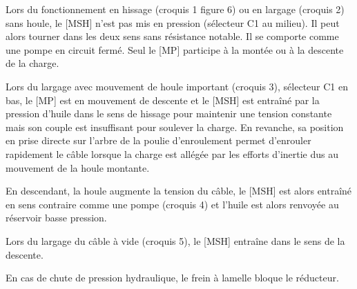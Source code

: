 \documentclass[10pt,fleqn]{article} %
\begin{document}
\vspace{.25cm}


\begin{minipage}[c]{.49\linewidth}
Lors du fonctionnement en hissage (croquis 1 figure 6) ou en largage (croquis 2) sans houle, le [MSH] n'est pas mis en pression (sélecteur C1 au milieu). Il peut alors tourner dans les deux sens sans résistance notable. Il se comporte comme une pompe en circuit fermé. Seul le [MP] participe à la montée ou à la descente de la charge. 

Lors du largage avec mouvement de houle important (croquis 3), sélecteur C1 en bas, le [MP] est en mouvement de descente et le [MSH] est entraîné par la pression d'huile dans le sens de hissage pour maintenir une tension constante mais son couple est insuffisant pour soulever la charge. En revanche, sa position en prise directe sur l'arbre de la poulie d'enroulement permet d'enrouler rapidement le câble lorsque la charge est allégée par les efforts d'inertie dus au mouvement de la houle montante. 

En descendant, la houle augmente la tension du câble, le [MSH] est alors entraîné en sens contraire comme une pompe (croquis 4) et l'huile est alors renvoyée au réservoir basse pression.

Lors du largage du câble à vide (croquis 5), le [MSH] entraîne dans le sens de la descente. 

En cas de chute de pression hydraulique, le frein à lamelle bloque le réducteur. 

\end{minipage} \hfill
\end{document}
